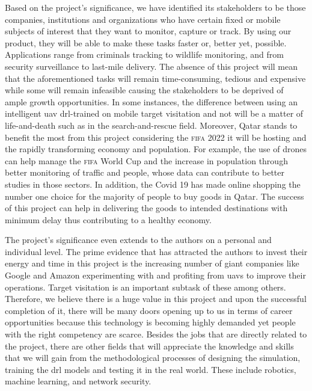 \documentclass[../main.tex]{subfiles}
\begin{document}
Based on the project's significance, we have identified 
its stakeholders to be 
those companies, institutions and organizations who
have certain fixed or mobile subjects of interest 
that they want to monitor, capture or track.
By using our product,
they will be able to make these tasks faster or,
better yet, possible.
Applications range from criminals tracking 
to wildlife monitoring,
and from security surveillance
to last-mile delivery.
The absence of this project will mean that
the aforementioned tasks will remain
time-consuming, tedious and expensive
while some will remain infeasible
causing the stakeholders to be deprived of ample growth opportunities.
In some instances, the difference between using 
an intelligent \gls{uav} \gls{drl}-trained on mobile target visitation
and not
will be a matter of life-and-death
such as in the search-and-rescue field.
Moreover, Qatar stands to benefit the most from this project 
considering the \textsc{fifa} 2022 it will be hosting
and the rapidly transforming economy and population.
For example, the use of drones can help manage 
the \textsc{fifa} World Cup 
and the increase in population through better monitoring 
of traffic and people, whose data can contribute
to better studies in those sectors.
In addition, the Covid 19 has made online shopping
the number one choice for the majority of people to buy goods in Qatar.
The success of this project can help in delivering
the goods to intended destinations with minimum delay
thus contributing to a healthy economy.

The project's significance even extends to the authors
on a personal and individual level.
The prime evidence that has attracted the authors to invest
their energy and time in this project is
the increasing number of giant companies like Google and Amazon
experimenting with and profiting from \glspl{uav}
to improve their operations.
Target visitation is an important subtask of these among others.
Therefore, we believe there is a huge value
in this project and upon the successful completion of it,
there will be many doors opening up to us in terms of
career opportunities because 
this technology is becoming highly demanded yet 
people with the right competency
are scarce.
Besides the jobs that are directly related to the project,
there are other fields that will appreciate the knowledge
and skills that we will gain from the methodological processes 
of designing the simulation,
training the \gls{drl} models and testing it in the real world.
These include robotics, machine learning, and 
network security.
\end{document}
